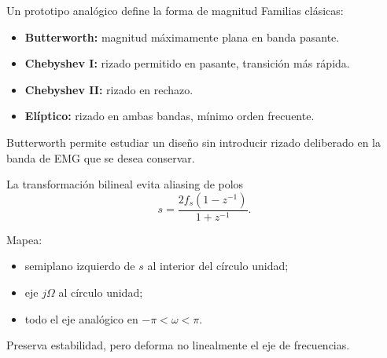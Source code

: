 \documentclass[
  ignorenonframetext,
  aspectratio=169,
  spanish,
  professionalfonts]{beamer}
\providecommand{\tightlist}{%
  \setlength{\itemsep}{0pt}\setlength{\parskip}{0pt}}
\begin{document}
\begin{frame}{Un prototipo analógico define la forma de magnitud}
\protect{}\label{un-prototipo-analuxf3gico-define-la-forma-de-magnitud}
Familias clásicas:

\begin{itemize}
\tightlist
\item
  \textbf{Butterworth:} magnitud máximamente plana en banda pasante.
\item
  \textbf{Chebyshev I:} rizado permitido en pasante, transición más
  rápida.
\item
  \textbf{Chebyshev II:} rizado en rechazo.
\item
  \textbf{Elíptico:} rizado en ambas bandas, mínimo orden frecuente.
\end{itemize}

\begin{tcolorbox}[enhanced jigsaw, arc=.35mm, bottomrule=.15mm, bottomtitle=1mm, breakable, colback=white, colbacktitle=quarto-callout-note-color!10!white, colframe=quarto-callout-note-color-frame, coltitle=black, left=2mm, leftrule=.75mm, opacityback=0, opacitybacktitle=0.6, rightrule=.15mm, title={Selección didáctica}, titlerule=0mm, toprule=.15mm, toptitle=1mm]

Butterworth permite estudiar un diseño sin introducir rizado deliberado
en la banda de EMG que se desea conservar.

\end{tcolorbox}
\end{frame}

\begin{frame}{La transformación bilineal evita aliasing de polos}
\protect{}\label{la-transformaciuxf3n-bilineal-evita-aliasing-de-polos}
\[
s=\frac{2f_s(1-z^{-1})}{1+z^{-1}}.
\]

Mapea:

\begin{itemize}
\tightlist
\item
  semiplano izquierdo de \(s\) al interior del círculo unidad;
\item
  eje \(j\Omega\) al círculo unidad;
\item
  todo el eje analógico en \(-\pi<\omega<\pi\).
\end{itemize}

\begin{tcolorbox}[enhanced jigsaw, arc=.35mm, bottomrule=.15mm, bottomtitle=1mm, breakable, colback=white, colbacktitle=quarto-callout-important-color!10!white, colframe=quarto-callout-important-color-frame, coltitle=black, left=2mm, leftrule=.75mm, opacityback=0, opacitybacktitle=0.6, rightrule=.15mm, title={Consecuencia}, titlerule=0mm, toprule=.15mm, toptitle=1mm]

Preserva estabilidad, pero deforma no linealmente el eje de frecuencias.

\end{tcolorbox}
\end{frame}
\end{document}
